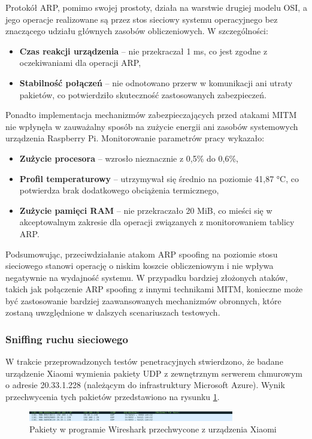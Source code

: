 Protokół ARP, pomimo swojej prostoty, działa na warstwie drugiej modelu OSI, a jego operacje realizowane są przez stos sieciowy systemu operacyjnego bez znaczącego udziału głównych zasobów obliczeniowych. W szczególności:
\begin{itemize}
    \item \textbf{Czas reakcji urządzenia} – nie przekraczał 1 ms, co jest zgodne z oczekiwaniami dla operacji ARP,
    \item \textbf{Stabilność połączeń} – nie odnotowano przerw w komunikacji ani utraty pakietów, co potwierdziło skuteczność zastosowanych zabezpieczeń.
\end{itemize}

Ponadto implementacja mechanizmów zabezpieczających przed atakami MITM nie wpłynęła w zauważalny sposób na zużycie energii ani zasobów systemowych urządzenia Raspberry Pi. Monitorowanie parametrów pracy wykazało:
\begin{itemize}
    \item \textbf{Zużycie procesora} – wzrosło nieznacznie z 0,5\% do 0,6\%,
    \item \textbf{Profil temperaturowy} – utrzymywał się średnio na poziomie 41,87 °C, co potwierdza brak dodatkowego obciążenia termicznego,
    \item \textbf{Zużycie pamięci RAM} – nie przekraczało 20 MiB, co mieści się w akceptowalnym zakresie dla operacji związanych z monitorowaniem tablicy ARP.
\end{itemize}

Podsumowując, przeciwdziałanie atakom ARP spoofing na poziomie stosu sieciowego stanowi operację o niskim koszcie obliczeniowym i nie wpływa negatywnie na wydajność systemu. W przypadku bardziej złożonych ataków, takich jak połączenie ARP spoofing z innymi technikami MITM, konieczne może być zastosowanie bardziej zaawansowanych mechanizmów obronnych, które zostaną uwzględnione w dalszych scenariuszach testowych.

\subsubsection{Sniffing ruchu sieciowego}
W trakcie przeprowadzonych testów penetracyjnych stwierdzono, że badane urządzenie Xiaomi wymienia pakiety UDP z zewnętrznym serwerem chmurowym o adresie 20.33.1.228 (należącym do infrastruktury Microsoft Azure). Wynik przechwycenia tych pakietów przedstawiono na rysunku \ref{fig:Pakiety w programie Wireshark przechwycone z urządzenia Xiaomi}.
\begin{figure}[h]
    \centering
    \includegraphics[width=0.8\textwidth]{pictures/wireshark-mitm-xiaomi.png}
    \caption{Pakiety w programie Wireshark przechwycone z urządzenia Xiaomi}
    \label{fig:Pakiety w programie Wireshark przechwycone z urządzenia Xiaomi}
\end{figure}

